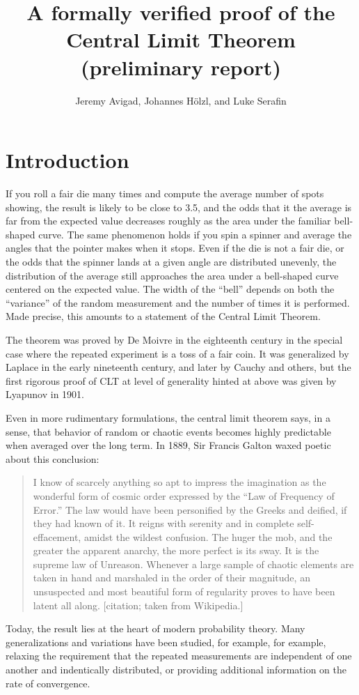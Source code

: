 \documentclass{article}
\title{A formally verified proof of the\\ Central Limit Theorem\\(preliminary report)}
\author{Jeremy Avigad, Johannes H\"olzl, and Luke Serafin}
\begin{document}
\maketitle

\section{Introduction}

If you roll a fair die many times and compute the average number of spots showing, the result is likely to be close to 3.5, and the odds that it the average is far from the expected value decreases roughly as the area under the familiar bell-shaped curve. The same phenomenon holds if you spin a spinner and average the angles that the pointer makes when it stops. Even if the die is not a fair die, or the odds that the spinner lands at a given angle are distributed unevenly, the distribution of the average still approaches the area under a bell-shaped curve centered on the expected value. The width of the ``bell'' depends on both the ``variance'' of the random measurement and the number of times it is performed. Made precise, this amounts to a statement of the Central Limit Theorem.

The theorem was proved by De Moivre in the eighteenth century in the special case where the repeated experiment is a toss of a fair coin. It was generalized by Laplace in the early nineteenth century, and later by Cauchy and others, but the first rigorous proof of CLT at level of generality hinted at above was given by Lyapunov in 1901.

Even in more rudimentary formulations, the central limit theorem says, in a sense, that behavior of random or chaotic events becomes highly predictable when averaged over the long term. In 1889, Sir Francis Galton waxed poetic about this conclusion:
\begin{quote}
 I know of scarcely anything so apt to impress the imagination as the wonderful form of cosmic order expressed by the ``Law of Frequency of Error.'' The law would have been personified by the Greeks and deified, if they had known of it. It reigns with serenity and in complete self-effacement, amidst the wildest confusion. The huger the mob, and the greater the apparent anarchy, the more perfect is its sway. It is the supreme law of Unreason. Whenever a large sample of chaotic elements are taken in hand and marshaled in the order of their magnitude, an unsuspected and most beautiful form of regularity proves to have been latent all along. [citation; taken from Wikipedia.]
\end{quote}
Today, the result lies at the heart of modern probability theory. Many generalizations and variations have been studied, for example, for example, relaxing the requirement that the repeated measurements are independent of one another and indentically distributed, or providing additional information on the rate of convergence.
\end{document}
